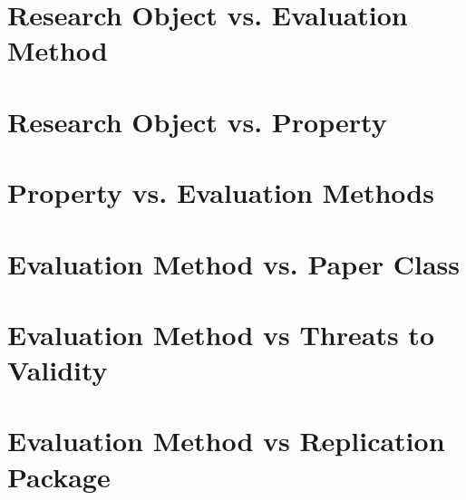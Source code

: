 \documentclass[a4paper, 11pt, twoside=semi]{scrartcl}
\begin{document}




\section{Research Object vs. Evaluation Method}




\section{Research Object vs. Property}








\section{Property vs. Evaluation Methods}




\section{Evaluation Method vs. Paper Class}




\section{Evaluation Method vs Threats to Validity}




\section{Evaluation Method vs Replication Package}
















\end{document}
